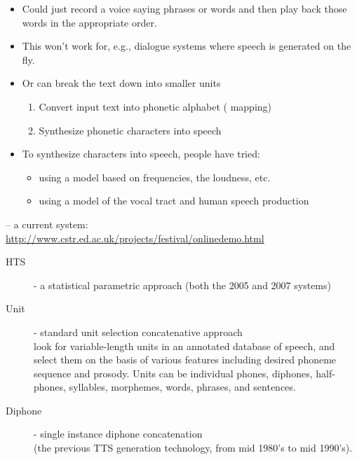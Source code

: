 \documentclass[a4paper,landscape,headrule,footrule,xetex]{foils}
\begin{document}
\begin{itemize}
\item Could just record a voice saying phrases or words and then play back those words in the appropriate order.
\item This won't work for, e.g., dialogue systems where speech is generated on the fly.
\item Or can break the text down into smaller units
  \begin{enumerate}
  \item Convert input text into phonetic alphabet ( mapping)
  \item Synthesize phonetic characters into speech 
  \end{enumerate}
\item  To synthesize characters into speech, people have tried:
  \begin{itemize}
  \item using a model based on frequencies, the loudness, etc.
  \item using a model of the vocal tract and human speech production
  \end{itemize}
\end{itemize}


 -- a current  system:
\\ \url{http://www.cstr.ed.ac.uk/projects/festival/onlinedemo.html}

\begin{description}
\item [HTS] - a statistical parametric approach (both the 2005 and 2007 systems)
\item [Unit] - standard unit selection concatenative approach
\\ look for variable-length units in an
annotated database of speech, and select them on the basis of various
features including desired phoneme sequence and prosody.
Units can be individual phones, diphones, half-phones, syllables, morphemes, words, phrases, and sentences. 
\item [Diphone] - single instance diphone concatenation
\\      (the previous TTS generation technology, from mid 1980's to mid 1990's). 
\end{description}

\end{document}
